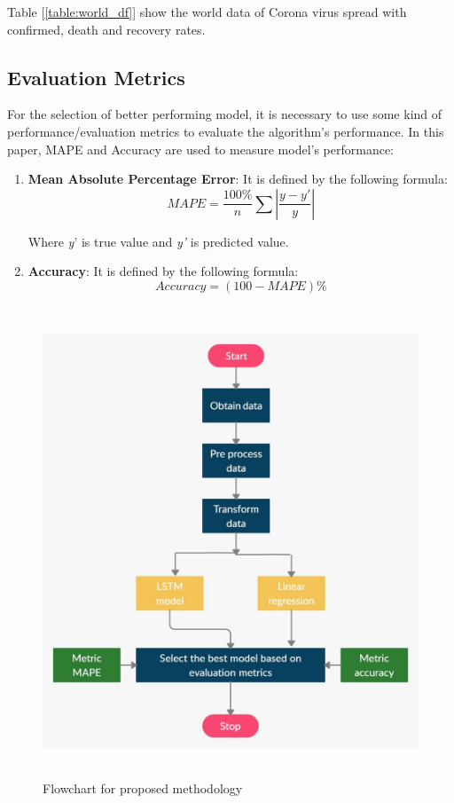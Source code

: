 Table [\ref{table:world_df}] show the world data of Corona virus spread with
confirmed, death and recovery rates.

\subsection{Evaluation Metrics}

For the selection of better performing model, it is necessary to use some kind
of performance/evaluation metrics to evaluate the algorithm’s performance.
In this paper, MAPE and Accuracy are used to
measure model's performance:

\begin{enumerate}
	\item \textbf{Mean Absolute Percentage Error}: It is defined by
		the following formula:
		\begin{equation}\label{eqn1}
			MAPE = \frac{100\%}{n} \sum \left \vert \frac{y-y\prime}{y}
			\right \vert
		\end{equation}

		Where \emph{y}' is true value and \emph{y'} is predicted value.

	\item \textbf{Accuracy}: It is defined by the following formula:
		\begin{equation}\label{eqn2}
			Accuracy = (100 - MAPE)\%
		\end{equation}

\end{enumerate}


\begin{figure}[!ht]
	  \centering
	  \includegraphics[height=14cm]{images/method.jpg}
	  \caption{Flowchart for proposed methodology}
	  \label{fig:method_flow}
\end{figure}

